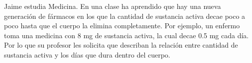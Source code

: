 Jaime estudia Medicina. En una clase ha aprendido que hay una nueva generación
de fármacos en los que la cantidad de
sustancia activa decae poco a poco hasta que el cuerpo la elimina
completamente. Por ejemplo, un enfermo toma una
medicina con 8 mg de sustancia activa, la cual decae 0.5 mg cada día. Por lo
que su profesor les solicita que describan
la relación entre cantidad de sustancia activa y los días que dura dentro del
cuerpo.

\begin{parts}
    \setlength{\columnsep}{30pt}
\end{parts}
